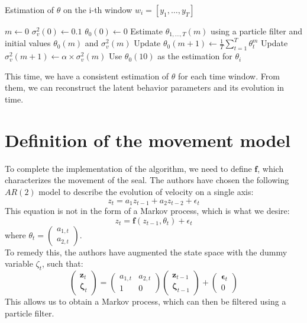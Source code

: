 \begin{algorithm}
\caption{Estimation of $\theta$ on the i-th window $w_i = [y_1, \dots ,y_T]$}
\label{alg:Estimation}
\begin{algorithmic}[1]
\State $m \gets 0$ 
\State $\sigma_v^2(0) \gets 0.1$ 
\State $\theta_0(0) \gets 0$ 
\State Estimate $\theta_{1,\dots,T}(m)$ using a particle filter and initial values $\theta_0(m)$ and $\sigma_v^2(m)$
\State Update $\theta_0(m+1) \gets \frac{1}{T}\sum_{t = 1}^{T}\theta_t^m$
\State Update $\sigma_v^2(m+1) \gets \alpha\times\sigma_v^2(m)$ 
\EndWhile
\State Use $\theta_0(10)$ as the estimation for $\theta_i$
\end{algorithmic}
\end{algorithm}

This time, we have a consistent estimation of $\theta$ for each time window. From them, we can reconstruct the latent behavior parameters and its evolution in time.

\section{Definition of the movement model}
To complete the implementation of the algorithm, we need to define $\mathbf{f}$, which characterizes the movement of the seal. The authors have chosen the following $AR(2)$ model to describe the evolution of velocity on a single axis:
\begin{equation}
z_t = a_1z_{t-1} + a_2z_{t-2} + \epsilon_t
\end{equation}
This equation is not in the form of a Markov process, which is what we desire:
$$
z_t = \mathbf{f}(z_{t-1}, \theta_t) + \epsilon_t
$$
where $\theta_t = \begin{pmatrix}
    a_{1,t}\\ a_{2,t}
\end{pmatrix}$.\\

To remedy this, the authors have augmented the state space with the dummy variable $\zeta_t$, such that:
\begin{equation}
\begin{pmatrix}
\mathbf{z}_t\\\mathbf{\zeta}_t
\end{pmatrix}
=
\begin{pmatrix}
a_{1,t}& a_{2,t} \\
1 & 0
\end{pmatrix}
\begin{pmatrix}
\mathbf{z}_{t-1}\\\mathbf{\zeta}_{t-1}
\end{pmatrix}
+
\begin{pmatrix}
\mathbf{\epsilon}_t \\ 0
\end{pmatrix}
\end{equation}
This allows us to obtain a Markov process, which can then be filtered using a particle filter.

